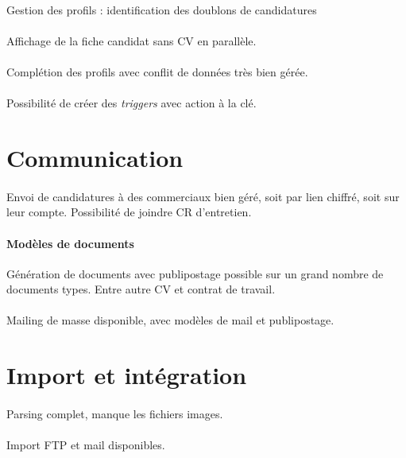 \documentclass[12pt,twoside]{scrreprt}
\begin{document}
\paragraph{} Gestion des profils : identification des doublons de candidatures
\paragraph{} Affichage de la fiche candidat sans CV en parallèle.
\paragraph{} Complétion des profils avec conflit de données très bien gérée.
\paragraph{} Possibilité de créer des \textit{triggers} avec action à la clé.

\section{Communication}
\paragraph{} Envoi de candidatures à des commerciaux bien géré, soit par lien chiffré, soit sur leur compte. Possibilité de joindre CR d'entretien.
\paragraph{Modèles de documents} Génération de documents avec publipostage possible sur un grand nombre de documents types. Entre autre CV et contrat de travail.
\paragraph{} Mailing de masse disponible, avec modèles de mail et publipostage.


\section{Import et intégration}
\paragraph{} Parsing complet, manque les fichiers images.
\paragraph{} Import FTP et mail disponibles.
\end{document}
